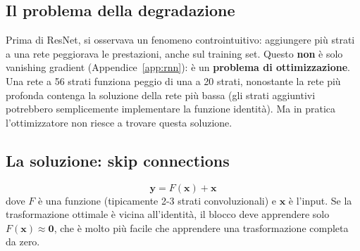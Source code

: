 \documentclass[12pt,a4paper]{article}
\begin{document}
\subsection{Il problema della degradazione}

Prima di ResNet, si osservava un fenomeno controintuitivo: aggiungere pi\`u strati a una rete peggiorava le prestazioni, anche sul training set. Questo \textbf{non} \`e solo vanishing gradient (Appendice~\ref{app:rnn}): \`e un \textbf{problema di ottimizzazione}. Una rete a 56 strati funziona peggio di una a 20 strati, nonostante la rete pi\`u profonda contenga la soluzione della rete pi\`u bassa (gli strati aggiuntivi potrebbero semplicemente implementare la funzione identit\`a). Ma in pratica l'ottimizzatore non riesce a trovare questa soluzione.

\subsection{La soluzione: skip connections}

\begin{formulabox}
\[
    \mathbf{y} = F(\mathbf{x}) + \mathbf{x}
\]
dove $F$ \`e una funzione (tipicamente 2-3 strati convoluzionali) e $\mathbf{x}$ \`e l'input. Se la trasformazione ottimale \`e vicina all'identit\`a, il blocco deve apprendere solo $F(\mathbf{x}) \approx \mathbf{0}$, che \`e molto pi\`u facile che apprendere una trasformazione completa da zero.
\end{formulabox}
\end{document}
